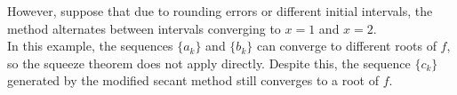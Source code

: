 \documentclass{article}
\begin{document}
However, suppose that due to rounding errors or different initial intervals, the method alternates between intervals converging to \( x = 1 \) and \( x = 2 \).
\\
In this example, the sequences \( \{ a_k \} \) and \( \{ b_k \} \) can converge to different roots of \( f \), so the squeeze theorem does not apply directly. Despite this, the sequence \( \{ c_k \} \) generated by the modified secant method still converges to a root of \( f \).
\end{document}

